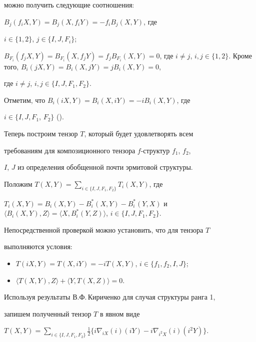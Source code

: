 можно получить следующие соотношения:


$B_j(f_iX,Y)=B_j(X,f_iY)=-f_iB_j(X,Y)$, где


$i\in\{1,2\}$, $j\in\{I,J,F_i\}$;


$B_{F_i}(f_jX,Y)=B_{F_i}(X,f_jY)=f_jB_{F_i}(X,Y)=0$, где $i\ne


j$, $i,j\in\{1,2\}$. Кроме того, $B_i(jX,Y)=B_i(X,jY)=jB_i(X,Y)=0$,


где $i\neq j$, $i,j\in\{I,J,F_1,F_2\}$.





Отметим, что $B_i(iX,Y)=B_i(X,iY)=-iB_i(X,Y)$, где


$i\in\{I,J,F_1$, $F_2\}$ (\cite{Kir}).





Теперь построим тензор $T$, который будет удовлетворять всем


требованиям для композиционного тензора $f$-структур $f_1$, $f_2$,


$I$, $J$ из определения обобщенной почти эрмитовой структуры.


Положим $T(X,Y)=\sum\limits_{i\in\{I,J,F_1,F_2\}}T_i(X,Y)$, где


$T_i(X,Y)=B_i(X,Y)-B_i^*(X,Y)-B_i^*(Y,X)$ и $\langle


B_i(X,Y),Z\rangle=\langle


X,B_i^*(Y,Z)\rangle$, $i\in\{I,J,F_1,F_2\}$.





Непосредственной проверкой можно установить, что для тензора $T$


выполняются условия:


\begin{itemize}


\item[1.] $T(iX,Y)=T(X,iY)=-iT(X,Y)$, $i\in\{f_1,f_2,I,J\}$;


\item[2.] $\langle T(X,Y),Z\rangle+\langle Y,T(X,Z)\rangle=0$.


\end{itemize}





Используя результаты В.Ф.\,Кириченко \cite{Kir} для случая структуры ранга 1,


запишем полученный тензор $T$ в явном виде


$T(X,Y)=\sum\limits_{i\in\{I,J,F_1,F_2\}}\frac{1}{2}\{i\nabla_{i


X}(i)(iY)-i\nabla_{i^2X}(i)(i^2Y)\}$.





